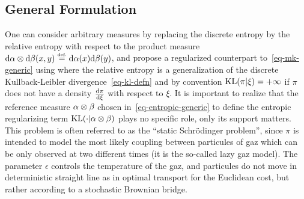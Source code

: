 

\subsection{General Formulation}

One can consider arbitrary measures by replacing the discrete entropy by the relative entropy with respect to the product measure $\mathrm{d}\alpha\otimes\mathrm{d}\beta(x,y) \stackrel{\mbox{\upshape\tiny def.}}{=} \mathrm{d}\alpha(x)\mathrm{d}\beta(y)$, and propose a regularized counterpart to~\eqref{eq-mk-generic} using
where the relative entropy is a generalization of the discrete Kullback-Leibler divergence~\eqref{eq-kl-defn}
and by convention $\operatorname{KL}(\pi|\xi)=+\infty$ if $\pi$ does not have a density $\frac{\mathrm{d} \pi}{\mathrm{d}\xi}$ with respect to $\xi$. 
%
It is important to realize that the reference measure $\alpha\otimes\beta$ chosen in~\eqref{eq-entropic-generic} to define the entropic regularizing term $\operatorname{KL}(\cdot|\alpha\otimes\beta)$ plays no specific role, only its support matters.
%
This problem is often referred to as the ``static Schr\"odinger problem'', since $\pi$ is intended to model the most likely coupling between particules of gaz which can be only observed at two different times (it is the so-called lazy gaz model). The parameter $\epsilon$ controls the temperature of the gaz, and particules do not move in deterministic straight line as in optimal transport for the Euclidean cost, but rather according to a stochastic Brownian bridge. 

%
%
%

